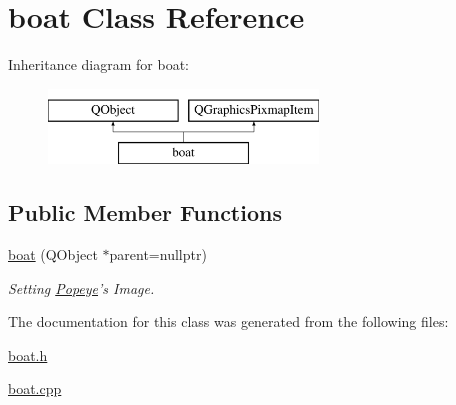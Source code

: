 \hypertarget{classboat}{\section{boat Class Reference}
\label{classboat}
}
Inheritance diagram for boat\-:\begin{figure}[H]
\begin{center}
\leavevmode
\includegraphics[height=2.000000cm]{classboat}
\end{center}
\end{figure}
\subsection*{Public Member Functions}
\begin{DoxyCompactItemize}
\item 
\hypertarget{classboat_a8cbefc8d0d8db323efcb8da6f05256f7}{\hyperlink{classboat_a8cbefc8d0d8db323efcb8da6f05256f7}{boat} (Q\-Object $\ast$parent=nullptr)}\label{classboat_a8cbefc8d0d8db323efcb8da6f05256f7}

\begin{DoxyCompactList}\small\item\em Setting \hyperlink{classPopeye}{Popeye}'s Image. \end{DoxyCompactList}\end{DoxyCompactItemize}


The documentation for this class was generated from the following files\-:\begin{DoxyCompactItemize}
\item 
\hyperlink{boat_8h}{boat.\-h}\item 
\hyperlink{boat_8cpp}{boat.\-cpp}\end{DoxyCompactItemize}

